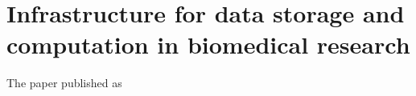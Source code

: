 \chapter{Infrastructure for data storage and computation in biomedical research}\label{app:infrastructure}
The paper \cite{kulhanek2010c} published as
 
